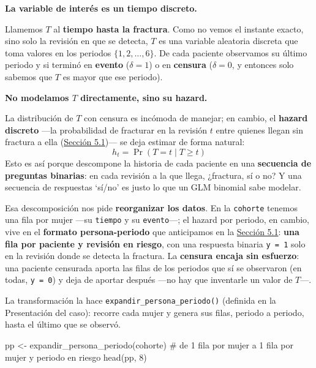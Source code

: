 \documentclass[
  letterpaper,
  DIV=11,
  numbers=noendperiod]{scrartcl}
\newenvironment{Shaded}{\begin{snugshade}}{\end{snugshade}}
\newcommand{\CommentTok}[1]{\textcolor[rgb]{0.37,0.37,0.37}{#1}}
\newcommand{\DecValTok}[1]{\textcolor[rgb]{0.68,0.00,0.00}{#1}}
\newcommand{\FunctionTok}[1]{\textcolor[rgb]{0.28,0.35,0.67}{#1}}
\newcommand{\NormalTok}[1]{\textcolor[rgb]{0.00,0.23,0.31}{#1}}
\newcommand{\OtherTok}[1]{\textcolor[rgb]{0.00,0.23,0.31}{#1}}
\begin{document}
\textbf{La variable de interés es un tiempo discreto.}

Llamemos \(T\) al \textbf{tiempo hasta la fractura}. Como no vemos el
instante exacto, sino solo la revisión en que se detecta, \(T\) es una
variable aleatoria discreta que toma valores en los periodos
\(\{1,2,\dots,6\}\). De cada paciente observamos su último periodo y si
terminó en \textbf{evento} (\(\delta=1\)) o en \textbf{censura}
(\(\delta=0\), y entonces solo sabemos que \(T\) es mayor que ese
periodo).

\textbf{No modelamos \(T\) directamente, sino su hazard.}

La distribución de \(T\) con censura es incómoda de manejar; en cambio,
el \textbf{hazard discreto} ---la probabilidad de fracturar en la
revisión \(t\) entre quienes llegan sin fractura a ella
(\protect\hyperlink{sec-u15-hazard}{Sección 5.1})--- se deja estimar de
forma natural: \[
h_t=\Pr(T=t\mid T\ge t)
\] Esto es así porque descompone la historia de cada paciente en una
\textbf{secuencia de preguntas binarias}: en cada revisión a la que
llega, ¿fractura, sí o no? Y una secuencia de respuestas `sí/no' es
justo lo que un GLM binomial sabe modelar.

Esa descomposición nos pide \textbf{reorganizar los datos}. En la
\texttt{cohorte} tenemos una fila por mujer ---su \texttt{tiempo} y su
\texttt{evento}---; el hazard por periodo, en cambio, vive en el
\textbf{formato persona-periodo} que anticipamos en la
\protect\hyperlink{sec-u15-hazard}{Sección 5.1}: \textbf{una fila por
paciente y revisión en riesgo}, con una respuesta binaria
\texttt{y\ =\ 1} solo en la revisión donde se detecta la fractura. La
\textbf{censura encaja sin esfuerzo}: una paciente censurada aporta las
filas de los periodos que sí se observaron (en todas, \texttt{y\ =\ 0})
y deja de aportar después ---no hay que inventarle un valor de \(T\)---.

La transformación la hace \texttt{expandir\_persona\_periodo()}
(definida en la Presentación del caso): recorre cada mujer y genera sus
filas, periodo a periodo, hasta el último que se observó.

\begin{Shaded}
\begin{Highlighting}[]
\NormalTok{pp }\OtherTok{\textless{}{-}} \FunctionTok{expandir\_persona\_periodo}\NormalTok{(cohorte)   }\CommentTok{\# de 1 fila por mujer a 1 fila por mujer y periodo en riesgo}
\FunctionTok{head}\NormalTok{(pp, }\DecValTok{8}\NormalTok{)}
\end{Highlighting}
\end{Shaded}
\end{document}
